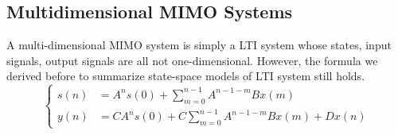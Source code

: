 \subsection{Multidimensional MIMO Systems}
A multi-dimensional MIMO system is simply a LTI system whose states, input signals, output signals are all not one-dimensional.
However, the formula we derived before to summarize state-space models of LTI system still holds.
\[
    \begin{cases}
        s(n) &= A^n s(0) + \sum_{m = 0}^{n - 1} A^{n - 1 - m} B x(m) \\
        y(n) &= C A^n s(0) + C \sum_{m = 0}^{n - 1} A^{n - 1 - m} B x(m) + D x(n)
    \end{cases}
\]
